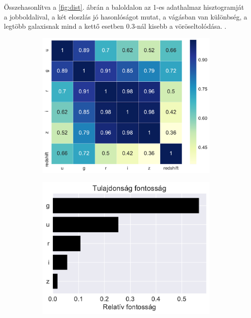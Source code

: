 \documentclass[12pt,letterpaper,oneside,openright]{book}
\begin{document}
 Összehasonlítva a \ref{fig:dist}. ábrán a baloldalon az 1-es adathalmaz hisztogramját a jobboldalival, a két eloszlás jó hasonlóságot mutat, a vágásban van különbség, a legtöbb galaxisnak mind a kettő esetben 0.3-nál kisebb a vöröseltolódása. .

 \begin{figure}[]
 \centering
  \begin{subfigure}[b]{0.32\textwidth}
    \includegraphics[width=\textwidth, height = \textwidth]{Figures/corrmap.pdf}
    \label{fig:1}
  \end{subfigure}
  \hspace{0cm}
  \begin{subfigure}[b]{0.32\textwidth}
    \includegraphics[width=\textwidth, height = \textwidth]{Figures/relf.pdf}

\end{subfigure}
\end{figure}
\end{document}
